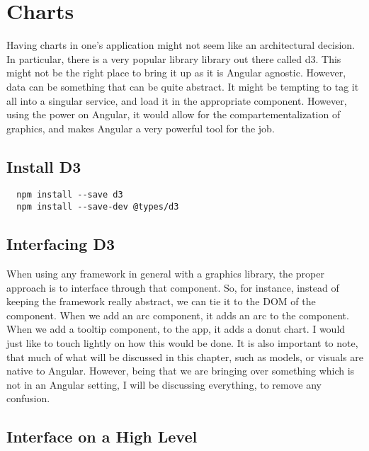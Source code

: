 \maketitle{}
\section{ Charts }

Having charts in one's application might not seem like an architectural
decision. In particular, there is a very popular library library out there
called d3. This might not be the right place to bring it up as it is Angular
agnostic. However, data can be something that can be quite abstract. It might
be tempting to tag it all into a singular service, and load it in the
appropriate component. However, using the power on Angular, it would allow for
the compartementalization of graphics, and makes Angular a very powerful tool
for the job.

\subsection{Install D3}
\begin{verbatim}
  npm install --save d3
  npm install --save-dev @types/d3
\end{verbatim}

\subsection{Interfacing D3}
When using any framework in general with a graphics library, the proper approach
is to interface through that component. So, for instance, instead of keeping
the framework really abstract, we can tie it to the DOM of the component. When
we add an arc component, it adds an arc to the component. When we add a tooltip
component, to the app, it adds a donut chart. I would just like to touch lightly
on how this would be done. It is also important to note, that much of what will
be discussed in this chapter, such as models, or visuals are native to Angular.
However, being that we are bringing over something which is not in an Angular
setting, I will be discussing everything, to remove any confusion.

\subsection{ Interface on a High Level }
